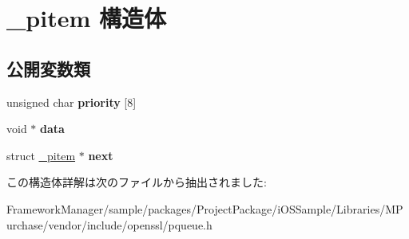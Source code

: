 \hypertarget{struct__pitem}{}\section{\+\_\+pitem 構造体}
\label{struct__pitem}
\subsection*{公開変数類}
\begin{DoxyCompactItemize}
\item 
\hypertarget{struct__pitem_af285b88224fe1db6562c5bf6208a995c}{}unsigned char {\bfseries priority} \mbox{[}8\mbox{]}\label{struct__pitem_af285b88224fe1db6562c5bf6208a995c}

\item 
\hypertarget{struct__pitem_ab57fcd99b0053a93df6e10cc5adb6401}{}void $\ast$ {\bfseries data}\label{struct__pitem_ab57fcd99b0053a93df6e10cc5adb6401}

\item 
\hypertarget{struct__pitem_aabdda0dcbfb04b14c640d4a117d0061f}{}struct \hyperlink{struct__pitem}{\+\_\+pitem} $\ast$ {\bfseries next}\label{struct__pitem_aabdda0dcbfb04b14c640d4a117d0061f}

\end{DoxyCompactItemize}


この構造体詳解は次のファイルから抽出されました\+:\begin{DoxyCompactItemize}
\item 
Framework\+Manager/sample/packages/\+Project\+Package/i\+O\+S\+Sample/\+Libraries/\+M\+Purchase/vendor/include/openssl/pqueue.\+h\end{DoxyCompactItemize}
